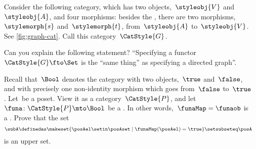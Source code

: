 \begin{gradedexercise}
    \label{ex:GraphsViaFunctors}
    Consider the following category, which has two objects,~$\styleobj{V}$ and~$\styleobj{A}$, and four morphisms: besides the , there are two morphisms,~$\stylemorph{s}$ and~$\stylemorph{t}$, from~$\styleobj{A}$ to~$\styleobj{V}$.
    See \cref{fig:graph-cat}.
    Call this category~$\CatStyle{G}$.

    Can you explain the following statement?
    ``Specifying a functor~$\CatStyle{G} \fto \Set$ is the ``same thing'' as specifying a directed graph''.
\end{gradedexercise}

\begin{marginfigure}
    \centering
    \caption{}
    \label{fig:graph-cat}
\end{marginfigure}

\begin{gradedexercise}
    \label{ex:UpperSetsViaFunctors}
    Recall that~$\Bool$ denotes the category with two objects,~$\true$ and~$\false$, and with precisely one non-identity morphism which goes from~$\false$ to~$\true$.
    Let~\posA be a poset.
    View it as a category~$\CatStyle{P}$, and let~$\funa \colon \CatStyle{P} \mto \Bool$ be a .
    In other words,~$\funaMap = \funaob$ is a .
    Prove that the set
    \begin{equation}
        \subA \definedas \makeset{ \posAel \setin \posAset \mid \funaMap(\posAel) = \true } \setsubseteq \posA
    \end{equation}
    is an upper set.
\end{gradedexercise}

